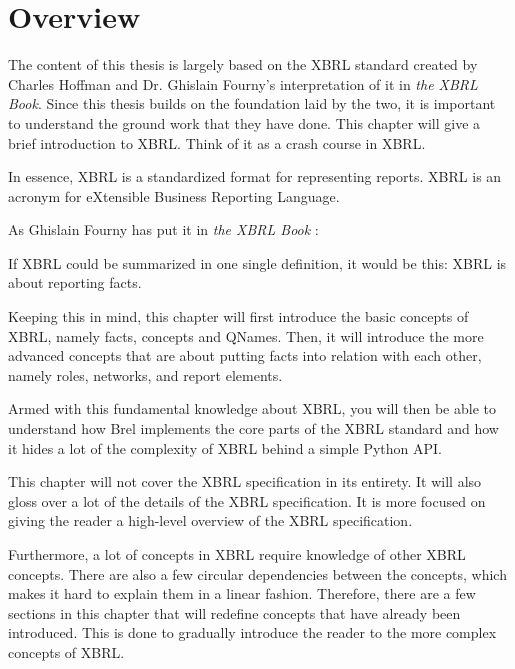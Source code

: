 \section{Overview}

The content of this thesis is largely based on the XBRL standard\cite{xbrl} created by Charles Hoffman and Dr. Ghislain Fourny's interpretation of it in \textit{the XBRL Book}\cite{fourny2023xbrl}.
Since this thesis builds on the foundation laid by the two, it is important to understand the ground work that they have done.
This chapter will give a brief introduction to XBRL.
Think of it as a crash course in XBRL.

In essence, XBRL is a standardized format for representing reports.
XBRL is an acronym for eXtensible Business Reporting Language.

As Ghislain Fourny has put it in \textit{the XBRL Book} \cite{fourny2023xbrl}:
\begin{displayquote}
    If XBRL could be summarized in one single definition, it would be this:
    XBRL is about reporting facts.
\end{displayquote}

Keeping this in mind, this chapter will first introduce the basic concepts of XBRL, namely facts, concepts and QNames.
Then, it will introduce the more advanced concepts that are about putting facts into relation with each other, namely roles, networks, and report elements.

Armed with this fundamental knowledge about XBRL, 
you will then be able to understand how Brel implements the core parts of the XBRL standard and how it hides a lot of the complexity of XBRL behind a simple Python API.

This chapter will not cover the XBRL specification in its entirety.
It will also gloss over a lot of the details of the XBRL specification.
It is more focused on giving the reader a high-level overview of the XBRL specification.

Furthermore, a lot of concepts in XBRL require knowledge of other XBRL concepts.
There are also a few circular dependencies between the concepts, which makes it hard to explain them in a linear fashion.
Therefore, there are a few sections in this chapter that will redefine concepts that have already been introduced.
This is done to gradually introduce the reader to the more complex concepts of XBRL.

